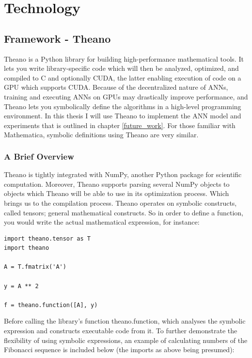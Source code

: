 
\chapter{Technology}
\section{Framework - Theano}

Theano is a Python library for building high-performance mathematical tools. It lets you write library-specific code which will then be analyzed, optimized, and compiled to C and optionally CUDA, the latter enabling execution of code on a GPU which supports CUDA. Because of the decentralized nature of ANNs, training and executing ANNs on GPUs may drastically improve performance, and Theano lets you symbolically define the algorithms in a high-level programming environment. In this thesis I will use Theano to implement the ANN model and experiments that is outlined in chapter \ref{future_work}. For those familiar with Mathematica, symbolic definitions using Theano are very similar.

\subsection{A Brief Overview}

Theano is tightly integrated with NumPy, another Python package for scientific computation. Moreover, Theano supports parsing several NumPy objects to objects which Theano will be able to use in its optimization process. Which brings us to the compilation process.
Theano operates on symbolic constructs, called tensors; general mathematical constructs. So in order to define a function, you would write the actual mathematical expression, for instance:

\begin{verbatim}
import theano.tensor as T
import theano

A = T.fmatrix('A')

y = A ** 2

f = theano.function([A], y)
\end{verbatim}

Before calling the library's function theano.function, which analyses the symbolic expression and constructs executable code from it. To further demonstrate the flexibility of using symbolic expressions, an example of calculating numbers of the Fibonacci sequence is included below (the imports as above being presumed):

